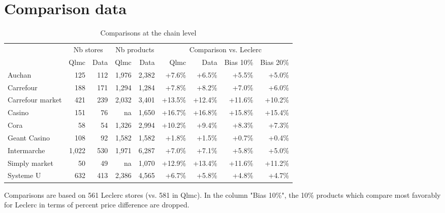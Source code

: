 \documentclass[english]{article}
\begin{document}
\section{Comparison data}

\begin{table}[H]
\begin{threeparttable}
\renewcommand{\arraystretch}{0.7}%
\caption{Comparisons at the chain level}\label{tab:qlmc_chain_comparisons}
\small
\begin{tabular}{l|rr|rr|rrrr}
\toprule
\toprule
          & \multicolumn{2}{c|}{Nb stores} &  \multicolumn{2}{c|}{Nb products} & \multicolumn{4}{c}{Comparison vs. Leclerc} \\
           & Qlmc  & Data  & Qlmc  & Data  & Qlmc  & Data  & Bias 10\% & Bias 20\% \\
\midrule
    Auchan & 125   & 112   & 1,976 & 2,382 & +7.6\% & +6.5\% & +5.5\% & +5.0\% \\
    Carrefour & 188   & 171   & 1,294 & 1,284 & +7.8\% & +8.2\% & +7.0\% & +6.0\% \\
    Carrefour market & 421   & 239   & 2,032 & 3,401 & +13.5\% & +12.4\% & +11.6\% & +10.2\% \\
    Casino & 151   & 76    & na    & 1,650 & +16.7\% & +16.8\% & +15.8\% & +15.4\% \\
    Cora  & 58    & 54    & 1,326 & 2,994 & +10.2\% & +9.4\% & +8.3\% & +7.3\% \\
    Geant Casino & 108   & 92    & 1,582 & 1,582 & +1.8\% & +1.5\% & +0.7\% & +0.4\% \\
    Intermarche & 1,022 & 530   & 1,971 & 6,287 & +7.0\% & +7.1\% & +5.8\% & +5.0\% \\
    Simply market & 50    & 49    & na    & 1,070 & +12.9\% & +13.4\% & +11.6\% & +11.2\% \\
    Systeme U & 632   & 413   & 2,386 & 4,565 & +6.7\% & +5.8\% & +4.8\% & +4.7\% \\
\bottomrule
\bottomrule
\end{tabular}
\begin{tablenotes}
      \small
      \item Comparisons are based on 561 Leclerc stores (vs. 581 in Qlmc). In the column "Bias 10\%", the 10\% products which compare most favorably for Leclerc in terms of percent price difference are dropped.
\end{tablenotes}
\end{threeparttable}
\end{table}
\end{document}
